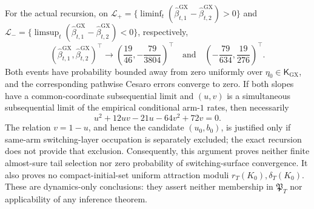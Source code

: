 For the actual recursion, on \(\mathcal L_+=\{\liminf_t(\widehat\beta^{\mathrm{GX}}_{t,1}-\widehat\beta^{\mathrm{GX}}_{t,2})>0\}\) and \(\mathcal L_-=\{\limsup_t(\widehat\beta^{\mathrm{GX}}_{t,1}-\widehat\beta^{\mathrm{GX}}_{t,2})<0\}\), respectively,
\[
 (\widehat\beta^{\mathrm{GX}}_{t,1},\widehat\beta^{\mathrm{GX}}_{t,2})^\top
 \longrightarrow
 \left(\frac{19}{46},-\frac{79}{3804}\right)^\top
 \quad\text{and}\quad
 \left(-\frac{79}{634},\frac{19}{276}\right)^\top.
\]
Both events have probability bounded away from zero uniformly over \(\eta_0\in\mathsf K_{\mathrm{GX}}\), and the corresponding pathwise Cesaro errors converge to zero. If both slopes have a common-coordinate subsequential limit and \((u,v)\) is a simultaneous subsequential limit of the empirical conditional arm-\(1\) rates, then necessarily
\[
 u^2+12uv-21u-64v^2+72v=0.
\]
The relation \(v=1-u\), and hence the candidate \((u_0,b_0)\), is justified only if same-arm switching-layer occupation is separately excluded; the exact recursion does not provide that exclusion. Consequently, this argument proves neither finite almost-sure tail selection nor zero probability of switching-surface convergence. It also proves no compact-initial-set uniform attraction moduli \(r_T(K_0),\delta_T(K_0)\). These are dynamics-only conclusions: they assert neither membership in \(\mathfrak P_T\) nor applicability of any inference theorem.